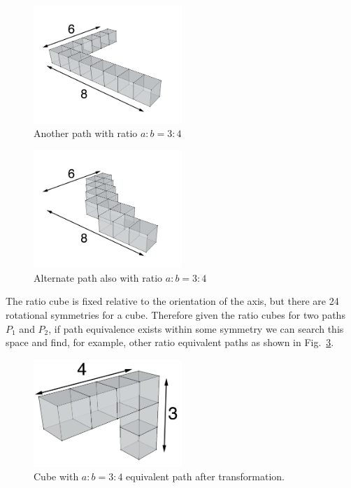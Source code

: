 \begin{figure}
  \centering
  \includegraphics[width=0.5\textwidth]{./figures/6by8}
    \caption{Another path with ratio $a:b = 3:4$}
		\label{fig:6by8}
\end{figure}
\begin{figure}
  \centering
  \includegraphics[width=0.5\textwidth]{./figures/6by8_squiggle}
    \caption{Alternate path also with ratio $a:b = 3:4$}
		\label{fig:6by8_squiggle}
\end{figure}

    

The ratio cube is fixed relative to the orientation of the axis, but there are 24 rotational symmetries for a cube.
Therefore given the ratio cubes for two paths $P_1$ and $P_2$, if path equivalence exists within some symmetry we can search this space and find, for example, other ratio equivalent paths as shown in Fig.~\ref{fig:3by4_upended}.

\begin{figure}
  \centering
  \includegraphics[width=0.5\textwidth]{./figures/3by4_upended.png}
  \caption{Cube with $a:b=3:4$ equivalent path after transformation.}
  \label{fig:3by4_upended}
\end{figure}


